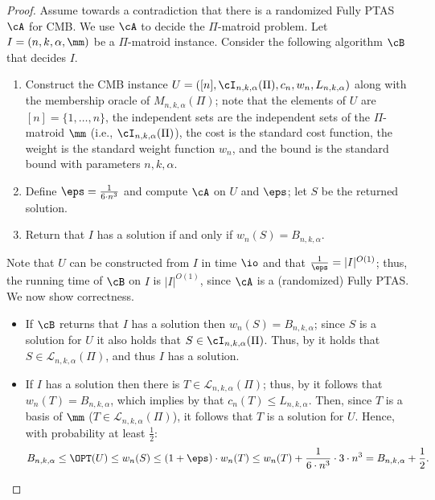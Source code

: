 	\begin{proof}
		Assume towards a contradiction that there is a randomized Fully PTAS $\cA$ for CMB. We use $\cA$ to decide the $\Pi$-matroid problem.  Let $I = \left(n,k,\alpha,\mm\right)$ be a $\Pi$-matroid instance. Consider the following algorithm $\cB$ that decides $I$.
		\begin{enumerate}
			\item Construct the CMB instance $%
			U= ([n],\cI_{n,k,\alpha}(\Pi),c_n,w_{n},L_{n,k,\alpha})$ along with the membership oracle of $M_{n,k,\alpha}(\Pi)$; note that the elements of $U$ are $[n] = \{1,\ldots, n \}$, the independent sets are the independent sets of the $\Pi$-matroid $\mm$ (i.e., $\cI_{n,k,\alpha}(\Pi)$), the cost is the standard cost function, the weight is the standard weight function $w_n$, and the bound is the standard bound with parameters $n,k,\alpha$. %
			\item Define $\eps = \frac{1}{6 \cdot n^3}$ and compute $\cA$ on $U$ and $\eps$; let $S$ be the returned solution.  
			\item Return that $I$ has a solution if and only if $w_n(S) = B_{n,k,\alpha}$. 
		\end{enumerate}
		Note that $U$ can be constructed from $I$ in time $\io$ and that $\frac{1}{\eps} = |I|^{O(1)}$; thus, the running time of $\cB$ on $I$ is $|I|^{O(1)}$, since $\cA$ is a (randomized) Fully PTAS. We now show correctness. %
		\begin{itemize}
			\item If $\cB$ returns that $I$ has a solution then  $w_n(S) = B_{n,k,\alpha}$; since $S$ is a solution for $U$ it also holds that $S \in \cI_{n,k,\alpha}(\Pi)$. Thus, by  it holds that $S\in \mathcal{L}_{n,k,\alpha}(\Pi)$, and thus  $I$ has a solution.  
			\item If $I$ has a solution then there is $T \in \mathcal{L}_{n,k,\alpha}(\Pi)$; thus, by   it follows that $w_n(T) = B_{n,k,\alpha}$, which implies by  that $c_n(T) \leq L_{n,k,\alpha}$. Then, since $T$ is a basis of $\mm$ ($T \in \mathcal{L}_{n,k,\alpha}(\Pi)$), it follows that $T$ is a solution for $U$.  Hence, with probability at least $\frac{1}{2}$:  
			\begin{equation}
				\label{eq:sOPTcmb}
				B_{n,k,\alpha} \leq \OPT(U) \leq w_n(S) \leq (1+\eps) \cdot w_n(T) \leq  w_n(T)+\frac{1}{6 \cdot n^3} \cdot 3 \cdot n^3 = B_{n,k,\alpha}+\frac{1}{2}.

\end{equation}
\end{itemize}
\end{proof}
